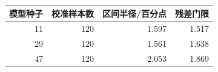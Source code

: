 \begin{tabular}{rrrr}\toprule
模型种子 & 校准样本数 & 区间半径/百分点 & 残差门限\\\midrule
11 & 120 & 1.597 & 1.517\\
29 & 120 & 1.561 & 1.638\\
47 & 120 & 2.053 & 1.869\\
\bottomrule\end{tabular}
